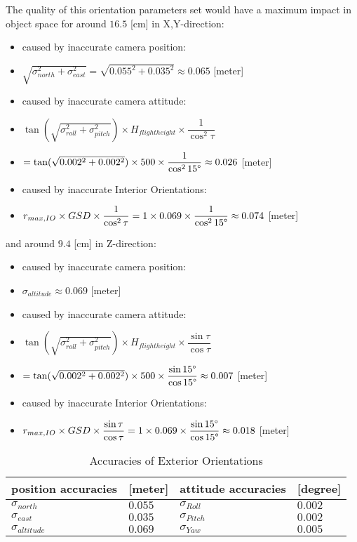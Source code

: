 The quality of this orientation parameters set would have a maximum impact in object space for around $16.5$ [cm] in X,Y-direction:
\begin{itemize}
      \item caused by inaccurate camera position: 
      \item [] $\sqrt{\sigma_{north}^2+\sigma_{east}^2}=\sqrt{0.055^2+0.035^2}\approx0.065$ [meter]
      \item caused by inaccurate camera attitude:
      \item [] $\tan(\sqrt{\sigma_{roll}^2+\sigma_{pitch}^2})\times H_{flight height}\times\dfrac{1}{\cos^2\tau}$
      \item [] $=\tan(\sqrt{0.002^2+0.002^2})\times 500\times\dfrac{1}{\cos^215\degree}\approx0.026$ [meter]
      \item caused by inaccurate Interior Orientations:
      \item [] $r_{max, IO}\times GSD\times\dfrac{1}{\cos^2\tau}=1\times0.069\times\dfrac{1}{\cos^215\degree}\approx0.074$ [meter]
\end{itemize}
and around $9.4$ [cm] in Z-direction:
\begin{itemize}
      \item caused by inaccurate camera position:
      \item [] $\sigma_{altitude}\approx0.069$ [meter]
      \item caused by inaccurate camera attitude:
      \item [] $\tan(\sqrt{\sigma_{roll}^2+\sigma_{pitch}^2})\times H_{flight height}\times\dfrac{\sin\tau}{\cos\tau}$
      \item [] $=\tan(\sqrt{0.002^2+0.002^2})\times 500\times\dfrac{\sin15\degree}{\cos15\degree}\approx0.007$ [meter]
      \item caused by inaccurate Interior Orientations:
      \item [] $r_{max, IO}\times GSD\times\dfrac{\sin\tau}{\cos\tau}=1\times0.069\times\dfrac{\sin15\degree}{\cos15\degree}\approx0.018$ [meter]
\end{itemize}


\begin{table}%
    \centering
    \begin{tabular}{ll|ll}
    \toprule
    position accuracies  &[meter]  & attitude accuracies & [degree]\\
    \midrule
    $\sigma_{north}$     & $0.055$ & $\sigma_{Roll}$  & $0.002$\\
    $\sigma_{east}$      & $0.035$ & $\sigma_{Pitch}$ & $0.002$\\
    $\sigma_{altitude}$  & $0.069$ & $\sigma_{Yaw}$   & $0.005$\\
    \bottomrule
    \end{tabular}
    \caption{Accuracies of Exterior Orientations}
    \label{tab:EOaccuracy}
\end{table}

